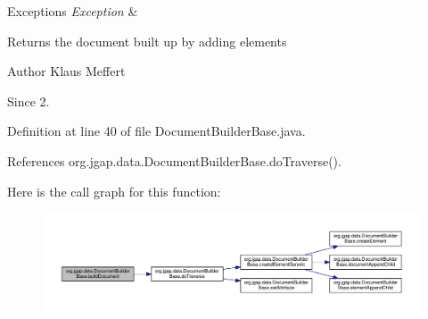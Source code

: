\begin{DoxyExceptions}{Exceptions}
{\em Exception} & \\
\hline
\end{DoxyExceptions}
\begin{DoxyReturn}{Returns}
the document built up by adding elements
\end{DoxyReturn}
\begin{DoxyAuthor}{Author}
Klaus Meffert 
\end{DoxyAuthor}
\begin{DoxySince}{Since}
2. 
\end{DoxySince}


Definition at line 40 of file Document\-Builder\-Base.\-java.



References org.\-jgap.\-data.\-Document\-Builder\-Base.\-do\-Traverse().



Here is the call graph for this function\-:
\nopagebreak
\begin{figure}[H]
\begin{center}
\leavevmode
\includegraphics[width=350pt]{classorg_1_1jgap_1_1data_1_1_document_builder_base_a9c17627652f63e842a01b23640244164_cgraph}
\end{center}
\end{figure}


